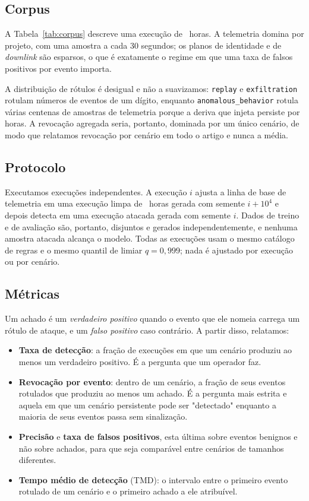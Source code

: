 \documentclass[conference]{IEEEtran}
\begin{document}
\subsection{Corpus}

A Tabela~\ref{tab:corpus} descreve uma execução de \expSimHours~horas. A
telemetria domina por projeto, com uma amostra a cada 30 segundos; os planos
de identidade e de \emph{downlink} são esparsos, o que é exatamente o regime em
que uma taxa de falsos positivos por evento importa.



A distribuição de rótulos é desigual e não a suavizamos: \texttt{replay} e
\texttt{exfiltration} rotulam números de eventos de um dígito, enquanto
\texttt{anomalous\_behavior} rotula várias centenas de amostras de telemetria
porque a deriva que injeta persiste por horas. A revocação agregada seria,
portanto, dominada por um único cenário, de modo que relatamos revocação por
cenário em todo o artigo e nunca a média.

\subsection{Protocolo}

Executamos \expNumSeeds{} execuções independentes. A execução $i$ ajusta a linha
de base de telemetria em uma execução limpa de \expSimHours~horas gerada com
semente $i + 10^{4}$ e depois detecta em uma execução atacada gerada com semente
$i$. Dados de treino e de avaliação são, portanto, disjuntos e gerados
independentemente, e nenhuma amostra atacada alcança o modelo. Todas as
execuções usam o mesmo catálogo de regras e o mesmo quantil de limiar
$q = 0{,}999$; nada é ajustado por execução ou por cenário.

\subsection{Métricas}

Um achado é um \emph{verdadeiro positivo} quando o evento que ele nomeia carrega
um rótulo de ataque, e um \emph{falso positivo} caso contrário. A partir disso,
relatamos:

\begin{itemize}
  \item \textbf{Taxa de detecção}: a fração de execuções em que um cenário
  produziu ao menos um verdadeiro positivo. É a pergunta que um operador faz.
  \item \textbf{Revocação por evento}: dentro de um cenário, a fração de seus
  eventos rotulados que produziu ao menos um achado. É a pergunta mais estrita e
  aquela em que um cenário persistente pode ser "detectado" enquanto a maioria
  de seus eventos passa sem sinalização.
  \item \textbf{Precisão} e \textbf{taxa de falsos positivos}, esta última sobre
  eventos benignos e não sobre achados, para que seja comparável entre cenários
  de tamanhos diferentes.
  \item \textbf{Tempo médio de detecção} (TMD): o intervalo entre o primeiro
  evento rotulado de um cenário e o primeiro achado a ele atribuível.
\end{itemize}
\end{document}
